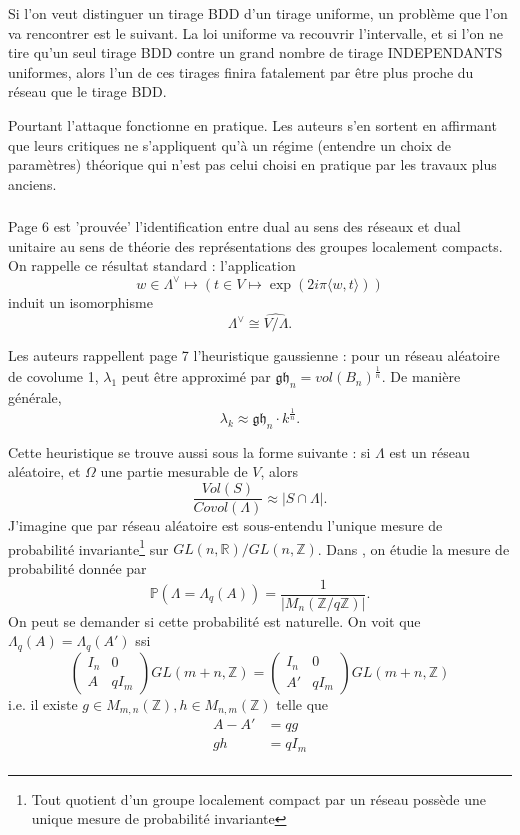 \documentclass{article}
\begin{document}
Si l'on veut distinguer un tirage BDD d'un tirage uniforme, un problème que l'on va rencontrer est le suivant. La loi uniforme va recouvrir l'intervalle, et si l'on ne tire qu'un seul tirage BDD contre un grand nombre de tirage INDEPENDANTS uniformes, alors l'un de ces tirages finira fatalement par être plus proche du réseau que le tirage BDD.

Pourtant l'attaque fonctionne en pratique. Les auteurs s'en sortent en affirmant que leurs critiques ne s'appliquent qu'à un régime (entendre un choix de paramètres) théorique qui n'est pas celui choisi en pratique par les travaux plus anciens.

\subsubsection{}

Page 6 est 'prouvée' l'identification entre dual au sens des réseaux et dual unitaire au sens de théorie des représentations des groupes localement compacts. On rappelle ce résultat standard : l'application 
$$w \in \Lambda^\vee \mapsto \left(t\in V \mapsto \exp(2i\pi \langle w,t \rangle)\right)$$ 
induit un isomorphisme $$\Lambda^\vee \cong \widehat{V/\Lambda}.$$ 

Les auteurs rappellent page 7 l'heuristique gaussienne : pour un réseau aléatoire de covolume 1, $\lambda_1$ peut être approximé par $\mathfrak{gh}_n = vol(B_n)^{\frac{1}{n}}$. De manière générale,
$$\lambda_k \approx \mathfrak{gh}_n \cdot k^{\frac{1}{n}}.$$ %

Cette heuristique se trouve aussi sous la forme suivante : si $\Lambda$ est un réseau aléatoire, et $\Omega$ une partie mesurable de $V$, alors 
\[\frac{Vol(S)}{Covol(\Lambda)} \approx |S\cap \Lambda|.\]
J'imagine que par réseau aléatoire est sous-entendu l'unique mesure de probabilité invariante\footnote{Tout quotient d'un groupe localement compact par un réseau possède une unique mesure de probabilité invariante} sur $GL(n,\mathbb R) / GL(n,\mathbb Z)$. Dans \cite{Shen}, on étudie la mesure de probabilité donnée par 
\[\mathbb P(\Lambda = \Lambda_q (A) ) = \frac{1}{|M_n(\mathbb Z / q\mathbb Z)|}.\]
On peut se demander si cette probabilité est naturelle. On voit que $\Lambda_q(A) = \Lambda_q(A')$ ssi 
\[\begin{pmatrix} I_n & 0 \\ A & qI_m \end{pmatrix} GL(m+n,\mathbb Z) = \begin{pmatrix} I_n & 0 \\ A' & qI_m \end{pmatrix}GL(m+n,\mathbb Z)\]
i.e. il existe $g\in M_{m,n}(\mathbb Z), h \in M_{n,m}(\mathbb Z)$ telle que 
\[\begin{split} 
A-A' & = qg \\
gh   & = qI_m \\
\end{split}\]	 
\end{document}

